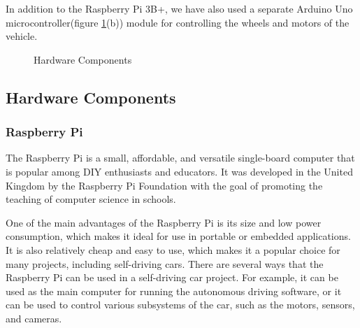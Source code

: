 \noindent
In addition to the Raspberry Pi 3B+, we have also used a separate Arduino Uno microcontroller(figure \ref{fig:hardware}(b)) module for controlling the wheels and motors of the vehicle.
\begin{figure}[H]
    \centering
    \caption{Hardware Components}
    \label{fig:hardware}
\end{figure}

\noindent
\subsection{Hardware Components}
\subsubsection{Raspberry Pi}
The Raspberry Pi is a small, affordable, and versatile single-board computer that is popular among DIY enthusiasts and educators. It was developed in the United Kingdom by the Raspberry Pi Foundation with the goal of promoting the teaching of computer science in schools.

\noindent
One of the main advantages of the Raspberry Pi is its size and low power consumption, which makes it ideal for use in portable or embedded applications. It is also relatively cheap and easy to use, which makes it a popular choice for many projects, including self-driving cars. There are several ways that the Raspberry Pi can be used in a self-driving car project. For example, it can be used as the main computer for running the autonomous driving software, or it can be used to control various subsystems of the car, such as the motors, sensors, and cameras. 

